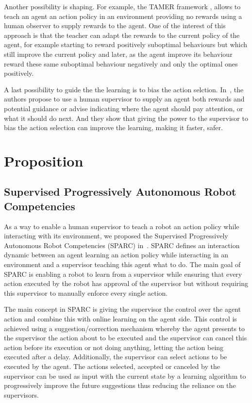 \documentclass[letterpaper]{article} %
\begin{document}
Another possibility is shaping. For example, the TAMER framework
\cite{knox2009interactively}, allows to teach an agent an action policy in an
environment providing no rewards using a human observer to supply rewards to the
agent. One of the interest of this approach is that the teacher can adapt the
rewards to the current policy of the agent, for example starting to reward
positively suboptimal behaviours but which still improve the current policy and
later, as the agent improve its behaviour reward these same suboptimal behaviour
negatively and only the optimal ones positively.

A last possibility to guide the the learning is to bias the action selction.
In~\cite{thomaz2008teachable}, the authors propose to use a human supervisor to
supply  an agent both rewards and potential guidance or advise indicating where
the agent should pay attention, or what it should do next. And they show that
giving the power to the supervisor to bias the action selection can improve the
learning, making it faster, safer.


\section{Proposition}
\subsection{Supervised Progressively Autonomous Robot Competencies}

As a way to enable a human supervisor to teach a robot an action policy while
interacting with its environment, we proposed the Supervised Progressively
Autonomous Robot Competencies (SPARC) in~\cite{senft2015sparc}. SPARC defines an
interaction dynamic between an agent learning an action policy while interacting
in an environment and a
supervisor teaching this agent what to do. The main goal of SPARC is
enabling a robot to learn from a supervisor while ensuring that every action
executed by the robot has approval of the supervisor but without requiring this
supervisor to manually enforce every single action.

The main concept in SPARC is giving the supervisor the control over the agent
action and combine this with online learning on the agent side. This control is
achieved using a suggestion/correction mechanism whereby the agent presents
to the supervisor the action about to be executed and the supervisor can cancel
this action before its execution or not doing anything, letting the action being
executed after a delay. Additionally, the supervisor can select actions to be
executed by the agent. The actions selected, accepted or canceled by the supervisor can be
used as input with the current state by a learning algorithm to progressively
improve the future suggestions thus reducing the reliance on the supervisors.
\end{document}
